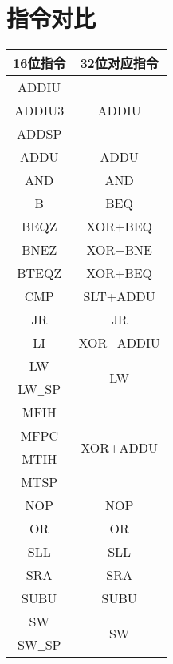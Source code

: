 \section{指令对比}
	\begin{table}[!hbp]
		\centering
		\begin{tabular}{|c|c|}
		\hline
		16位指令 & 32位对应指令 \\
		\hline
		ADDIU &\multirow{3}{*}{ADDIU} \\	
		\cline{1-1}{ADDIU3} & \\	
		\cline{1-1}{ADDSP} & \\
		\hline
		ADDU & ADDU\\
		\hline
		AND & AND\\
		\hline
		B & BEQ \\
		\hline
		BEQZ & XOR+BEQ \\
		\hline
		BNEZ & XOR+BNE \\
		\hline
		BTEQZ & XOR+BEQ \\
		\hline
		CMP & SLT+ADDU \\
		\hline
		JR & JR \\
		\hline
		LI & XOR+ADDIU\\
		\hline
		LW & \multirow{2}{*}{LW} \\	
		\cline{1-1}{LW$\underline{\hbox to 2mm{}}$SP} & \\
		\hline
		MFIH & \multirow{4}{*}{XOR+ADDU} \\
		\cline{1-1}{MFPC} & \\
		\cline{1-1}{MTIH} & \\
		\cline{1-1}{MTSP} & \\
		NOP	& NOP \\
		\hline
		OR & OR \\
		\hline
		SLL & SLL \\
		\hline
		SRA & SRA \\
		\hline		
		SUBU & SUBU \\
		\hline	
		SW & \multirow{2}{*}{SW} \\	
		\cline{1-1}{SW$\underline{\hbox to 2mm{}}$SP} & \\
		\hline
		\end{tabular}
	\end{table}
\newpage